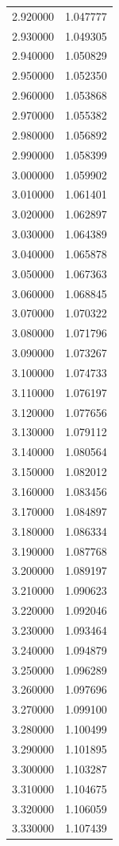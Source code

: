 \begin{tabular}{rr}
2.920000 & 1.047777 \\
2.930000 & 1.049305 \\
2.940000 & 1.050829 \\
2.950000 & 1.052350 \\
2.960000 & 1.053868 \\
2.970000 & 1.055382 \\
2.980000 & 1.056892 \\
2.990000 & 1.058399 \\
3.000000 & 1.059902 \\
3.010000 & 1.061401 \\
3.020000 & 1.062897 \\
3.030000 & 1.064389 \\
3.040000 & 1.065878 \\
3.050000 & 1.067363 \\
3.060000 & 1.068845 \\
3.070000 & 1.070322 \\
3.080000 & 1.071796 \\
3.090000 & 1.073267 \\
3.100000 & 1.074733 \\
3.110000 & 1.076197 \\
3.120000 & 1.077656 \\
3.130000 & 1.079112 \\
3.140000 & 1.080564 \\
3.150000 & 1.082012 \\
3.160000 & 1.083456 \\
3.170000 & 1.084897 \\
3.180000 & 1.086334 \\
3.190000 & 1.087768 \\
3.200000 & 1.089197 \\
3.210000 & 1.090623 \\
3.220000 & 1.092046 \\
3.230000 & 1.093464 \\
3.240000 & 1.094879 \\
3.250000 & 1.096289 \\
3.260000 & 1.097696 \\
3.270000 & 1.099100 \\
3.280000 & 1.100499 \\
3.290000 & 1.101895 \\
3.300000 & 1.103287 \\
3.310000 & 1.104675 \\
3.320000 & 1.106059 \\
3.330000 & 1.107439 \\

\end{tabular}

